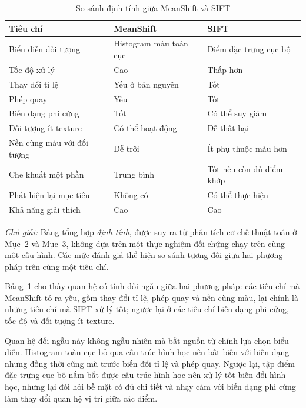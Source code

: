 \documentclass[12pt,a4paper]{article}
\numberwithin{equation}{section}
\begin{document}
\begin{table}[H]
\centering
\caption{So sánh định tính giữa MeanShift và SIFT}
\label{tab:compare}
\small
\begin{tabularx}{\textwidth}{@{}l>{\raggedright\arraybackslash}X>{\raggedright\arraybackslash}X@{}}
\toprule
\textbf{Tiêu chí} & \textbf{MeanShift} & \textbf{SIFT} \\
\midrule
Biểu diễn đối tượng & Histogram màu toàn cục & Điểm đặc trưng cục bộ \\
Tốc độ xử lý & Cao & Thấp hơn \\
Thay đổi tỉ lệ & Yếu ở bản nguyên & Tốt \\
Phép quay & Yếu & Tốt \\
Biến dạng phi cứng & Tốt & Có thể suy giảm \\
Đối tượng ít texture & Có thể hoạt động & Dễ thất bại \\
Nền cùng màu với đối tượng & Dễ trôi & Ít phụ thuộc màu hơn \\
Che khuất một phần & Trung bình & Tốt nếu còn đủ điểm khớp \\
Phát hiện lại mục tiêu & Không có & Có thể thực hiện \\
Khả năng giải thích & Cao & Cao \\
\bottomrule
\end{tabularx}

\vspace{4pt}
\begin{minipage}{0.97\textwidth}
{\footnotesize \textit{Chú giải:} Bảng tổng hợp \textit{định tính}, được suy ra từ phân tích cơ
chế thuật toán ở Mục~2 và Mục~3, không dựa trên một thực nghiệm đối chứng chạy trên cùng một cấu
hình. Các mức đánh giá thể hiện so sánh tương đối giữa hai phương pháp trên cùng một tiêu chí.}
\end{minipage}
\end{table}

Bảng~\ref{tab:compare} cho thấy quan hệ có tính đối ngẫu giữa hai phương pháp: các tiêu chí mà
MeanShift tỏ ra yếu, gồm thay đổi tỉ lệ, phép quay và nền cùng màu, lại chính là những tiêu chí mà
SIFT xử lý tốt; ngược lại ở các tiêu chí biến dạng phi cứng, tốc độ và đối tượng ít texture.

Quan hệ đối ngẫu này không ngẫu nhiên mà bắt nguồn từ chính lựa chọn biểu diễn. Histogram toàn cục
bỏ qua cấu trúc hình học nên bất biến với biến dạng nhưng đồng thời cũng mù trước biến đổi tỉ lệ
và phép quay. Ngược lại, tập điểm đặc trưng cục bộ nắm bắt được cấu trúc hình học nên xử lý tốt
biến đổi hình học, nhưng lại đòi hỏi bề mặt có đủ chi tiết và nhạy cảm với biến dạng phi cứng làm
thay đổi quan hệ vị trí giữa các điểm.
\end{document}
